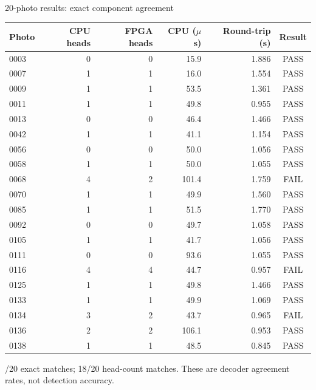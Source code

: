 \documentclass[aspectratio=169,10pt]{beamer}
\begin{document}
\begin{frame}{20-photo results: exact component agreement}
\centering\scriptsize
\setlength{\tabcolsep}{9pt}
\renewcommand{\arraystretch}{0.95}
\begin{tabular}{lrrrrc}
\toprule
Photo & CPU heads & FPGA heads & CPU ($\mu$s) & Round-trip (s) & Result \\
\midrule
0003 & 0 & 0 & 15.9 & 1.886 & \textcolor{passgreen}{PASS} \\
0007 & 1 & 1 & 16.0 & 1.554 & \textcolor{passgreen}{PASS} \\
0009 & 1 & 1 & 53.5 & 1.361 & \textcolor{passgreen}{PASS} \\
0011 & 1 & 1 & 49.8 & 0.955 & \textcolor{passgreen}{PASS} \\
0013 & 0 & 0 & 46.4 & 1.466 & \textcolor{passgreen}{PASS} \\
0042 & 1 & 1 & 41.1 & 1.154 & \textcolor{passgreen}{PASS} \\
0056 & 0 & 0 & 50.0 & 1.056 & \textcolor{passgreen}{PASS} \\
0058 & 1 & 1 & 50.0 & 1.055 & \textcolor{passgreen}{PASS} \\
0068 & 4 & 2 & 101.4 & 1.759 & \textcolor{failred}{FAIL} \\
0070 & 1 & 1 & 49.9 & 1.560 & \textcolor{passgreen}{PASS} \\
0085 & 1 & 1 & 51.5 & 1.770 & \textcolor{passgreen}{PASS} \\
0092 & 0 & 0 & 49.7 & 1.058 & \textcolor{passgreen}{PASS} \\
0105 & 1 & 1 & 41.7 & 1.056 & \textcolor{passgreen}{PASS} \\
0111 & 0 & 0 & 93.6 & 1.055 & \textcolor{passgreen}{PASS} \\
0116 & 4 & 4 & 44.7 & 0.957 & \textcolor{failred}{FAIL} \\
0125 & 1 & 1 & 49.8 & 1.466 & \textcolor{passgreen}{PASS} \\
0133 & 1 & 1 & 49.9 & 1.069 & \textcolor{passgreen}{PASS} \\
0134 & 3 & 2 & 43.7 & 0.965 & \textcolor{failred}{FAIL} \\
0136 & 2 & 2 & 106.1 & 0.953 & \textcolor{passgreen}{PASS} \\
0138 & 1 & 1 & 48.5 & 0.845 & \textcolor{passgreen}{PASS} \\
\bottomrule
\end{tabular}
\par{}/20 exact matches; 18/20 head-count matches. These are decoder agreement rates, not detection accuracy.
\end{frame}
\end{document}
